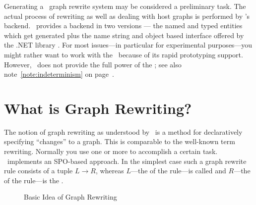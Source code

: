 Generating a \GrG\ graph rewrite system may be considered a preliminary task.
The actual process of rewriting as well as dealing with host graphs is performed by \GrG's backend.
\GrG\ provides a backend  in two versions --- the named and typed entities which get generated plus the name string and object based interface offered by the .NET library \LibGr.
For most issues---in particular for experimental purposes---you might rather want to work with the \GrShell\ because of its rapid prototyping support.
However, \GrShell\ does not provide the full power of the \LibGr; see also note~\ref{note:indeterminism} on page~\pageref{note:indeterminism}.


\section{What is Graph Rewriting?}
\label{ov:whatsallabout}

The notion of graph rewriting as understood by \GrG\ is a method for declaratively specifying ``changes'' to a graph.
This is comparable to the well-known term rewriting. 
Normally you use one or more  to accomplish a certain task.
\GrG\ implements an SPO-based approach.
In the simplest case such a graph rewrite rule consists of a tuple $L \rightarrow R$, whereas $L$---the  of the rule---is called  and $R$---the  of the rule---is the .

\begin{figure}[htbp]
	\centering
  \caption{Basic Idea of Graph Rewriting}
  \label{figrule}
\end{figure}

